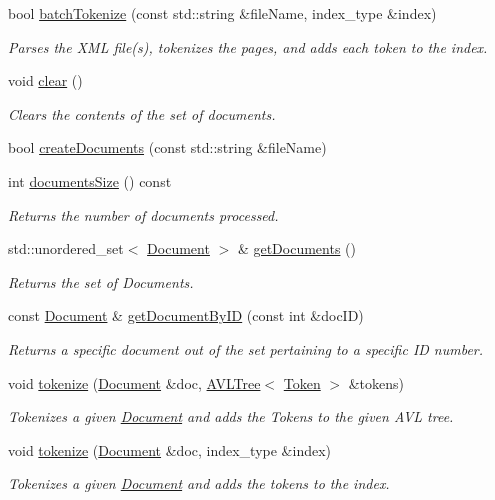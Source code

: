 \begin{DoxyCompactItemize}
bool \hyperlink{class_document_processor_a19db4cd4e6367bbbd51fb6b6b1ea8396}{batch\+Tokenize} (const std\+::string \&file\+Name, index\+\_\+type \&index)
\begin{DoxyCompactList}\small\item\em Parses the X\+M\+L file(s), tokenizes the pages, and adds each token to the index. \end{DoxyCompactList}\item 
void \hyperlink{class_document_processor_a126fc41f4a3ec8af3240714862e686c5}{clear} ()
\begin{DoxyCompactList}\small\item\em Clears the contents of the set of documents. \end{DoxyCompactList}\item 
bool \hyperlink{class_document_processor_a0ca26f0de7652ae68da6ad06673b2304}{create\+Documents} (const std\+::string \&file\+Name)
\item 
int \hyperlink{class_document_processor_a09d1b766a653de2d1ce6a81f2213d975}{documents\+Size} () const 
\begin{DoxyCompactList}\small\item\em Returns the number of documents processed. \end{DoxyCompactList}\item 
std\+::unordered\+\_\+set$<$ \hyperlink{class_document}{Document} $>$ \& \hyperlink{class_document_processor_a7e0fff87749449ff712fab6deed57e8e}{get\+Documents} ()
\begin{DoxyCompactList}\small\item\em Returns the set of Documents. \end{DoxyCompactList}\item 
const \hyperlink{class_document}{Document} \& \hyperlink{class_document_processor_a3f725ffc320008889f9a2797b8dadb70}{get\+Document\+By\+I\+D} (const int \&doc\+I\+D)
\begin{DoxyCompactList}\small\item\em Returns a specific document out of the set pertaining to a specific I\+D number. \end{DoxyCompactList}\item 
void \hyperlink{class_document_processor_a2efd77c307ac1672d77b582be3cf57f9}{tokenize} (\hyperlink{class_document}{Document} \&doc, \hyperlink{class_a_v_l_tree}{A\+V\+L\+Tree}$<$ \hyperlink{class_token}{Token} $>$ \&tokens)
\begin{DoxyCompactList}\small\item\em Tokenizes a given \hyperlink{class_document}{Document} and adds the Tokens to the given A\+V\+L tree. \end{DoxyCompactList}\item 
void \hyperlink{class_document_processor_ab83334ce4255441e2757dc39cdbbd1ed}{tokenize} (\hyperlink{class_document}{Document} \&doc, index\+\_\+type \&index)
\begin{DoxyCompactList}\small\item\em Tokenizes a given \hyperlink{class_document}{Document} and adds the tokens to the index. \end{DoxyCompactList}\end{DoxyCompactItemize}


